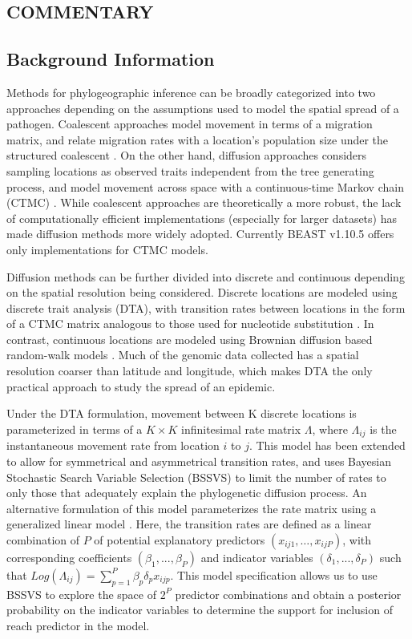 \documentclass{article}
\begin{document}
\begin{multicols}{2}

\section*{COMMENTARY}
\subsection*{Background Information}

Methods for phylogeographic inference can be broadly categorized into two approaches depending on the assumptions used to model the spatial spread of a pathogen. Coalescent approaches model movement in terms of a migration matrix, and relate migration rates with a location's population size under the structured coalescent \cite{basta,mascot}. On the other hand, diffusion approaches considers sampling locations as observed traits independent from the tree generating process, and model movement across space with a continuous-time Markov chain (CTMC) \cite{dta,rw}.  While coalescent approaches are theoretically a more robust, the lack of computationally efficient implementations (especially for larger datasets) has made diffusion methods more widely adopted. Currently BEAST v1.10.5 offers only implementations for CTMC models.

Diffusion methods can be further divided into discrete and continuous depending on the spatial resolution being considered. Discrete locations are modeled using discrete trait analysis (DTA), with transition rates between locations in the form of a CTMC matrix analogous to those used for nucleotide substitution \cite{dta}. In contrast, continuous locations are modeled using Brownian diffusion based random-walk models \cite{rw}. Much of the genomic data collected has a spatial resolution coarser than latitude and longitude, which makes DTA the only practical approach to study the spread of an epidemic. 

Under the DTA formulation, movement between K discrete locations is parameterized in terms of a $K \times K$ infinitesimal rate matrix $\Lambda$, where $\Lambda_{ij}$ is the instantaneous movement rate from location $i$ to $j$. This model has been extended to allow for symmetrical and asymmetrical transition rates, and uses Bayesian Stochastic Search Variable Selection (BSSVS) to limit the number of rates to only those that adequately explain the phylogenetic diffusion process. An alternative formulation of this model parameterizes the rate matrix using a generalized linear model \cite{glm}. Here, the transition rates are defined as a linear combination of $P$ of potential explanatory predictors $(x_{ij1}, \dots, x_{ijP})$, with corresponding coefficients $(\beta_1, ..., \beta_P )$ and indicator variables $(\delta_1, ..., \delta_P )$ such that $Log(\Lambda_{ij}) = \sum_{p=1}^P \beta_p \delta_p x_{ijp}$. This model specification allows us to use BSSVS to explore the space of $2^P$ predictor combinations and obtain a posterior probability on the indicator variables to determine the support for inclusion of reach predictor in the model.


\end{multicols}
\end{document}
